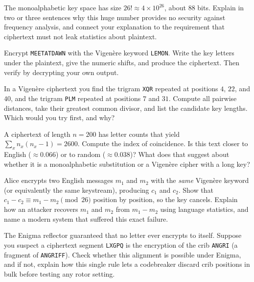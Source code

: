 \begin{exercise}
\label{ch02:ex-keyspace}
The monoalphabetic key space has size $26! \approx 4\times10^{26}$, about $88$ bits. Explain in
two or three sentences why this huge number provides no security against frequency analysis, and
connect your explanation to the requirement that ciphertext must not leak statistics about
plaintext.
\end{exercise}

\begin{exercise}
\label{ch02:ex-vig-enc}
Encrypt \texttt{MEETATDAWN} with the Vigen\`ere keyword \texttt{LEMON}. Write the key letters
under the plaintext, give the numeric shifts, and produce the ciphertext. Then verify by
decrypting your own output.
\end{exercise}

\begin{exercise}
\label{ch02:ex-kasiski}
In a Vigen\`ere ciphertext you find the trigram \texttt{XQR} repeated at positions $4$, $22$, and
$40$, and the trigram \texttt{PLM} repeated at positions $7$ and $31$. Compute all pairwise
distances, take their greatest common divisor, and list the candidate key lengths. Which would
you try first, and why?
\end{exercise}

\begin{exercise}
\label{ch02:ex-ioc}
A ciphertext of length $n=200$ has letter counts that yield $\sum_x n_x(n_x-1) = 2600$. Compute
the index of coincidence. Is this text closer to English ($\approx 0.066$) or to random
($\approx 0.038$)? What does that suggest about whether it is a monoalphabetic substitution or a
Vigen\`ere cipher with a long key?
\end{exercise}

\begin{exercise}
\label{ch02:ex-twotime}
Alice encrypts two English messages $m_1$ and $m_2$ with the \emph{same} Vigen\`ere keyword (or
equivalently the same keystream), producing $c_1$ and $c_2$. Show that $c_1 - c_2 \equiv m_1 -
m_2 \pmod{26}$ position by position, so the key cancels. Explain how an attacker recovers
$m_1$ and $m_2$ from $m_1 - m_2$ using language statistics, and name a modern system that
suffered this exact failure.
\end{exercise}

\begin{exercise}
\label{ch02:ex-enigma-self}
The Enigma reflector guaranteed that no letter ever encrypts to itself. Suppose you suspect a
ciphertext segment \texttt{LXGPQ} is the encryption of the crib \texttt{ANGRI} (a fragment of
\texttt{ANGRIFF}). Check whether this alignment is possible under Enigma, and if not, explain
how this single rule lets a codebreaker discard crib positions in bulk before testing any rotor
setting.
\end{exercise}

